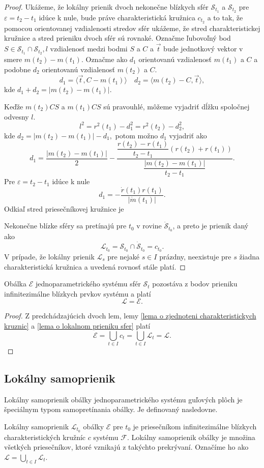 \begin{proof}
Ukážeme, že lokálny prienik dvoch nekonečne blízkych sfér $\mathcal{S}_{t_1}$ a $\mathcal{S}_{t_2}$ pre $\varepsilon = t_2 - t_1$ idúce k nule, bude práve charakteristická kružnica $c_{t_2}$ a to tak, že pomocou orientovanej vzdialenosti stredov sfér ukážeme, že stred charakteristickej kružnice a stred prieniku dvoch sfér sú rovnaké.
Označme ľubovoľný bod $S \in \mathcal{S}_{t_1} \cap \mathcal{S}_{t_2}, l $ vzdialenosť medzi bodmi $S$ a $C$ a $\vec{t} $ bude jednotkový vektor v smere $ m(t_2) - m(t_1).$
Označme ako $d_1$ orientovanú vzdialenosť $m(t_1)$ a $C$ a podobne $d_2$ orientovanú vzdialenosť $m(t_2)$ a $C.$
$$ d_1 = \langle \vec{t}, C - m(t_1) \rangle \quad d_2 = \langle m(t_2) - C,  \vec{t} \rangle, $$
kde $d_1 + d_2 = | m(t_2) - m(t_1) |.$

Keďže $m(t_2)CS$ a $m(t_1)CS$ sú pravouhlé, môžeme vyjadriť dĺžku spoločnej odvesny $l.$
$$l^2 = r^2(t_1) - d^2_1 = r^2(t_2) - d^2_2,$$
kde $d_2 = |m(t_2) - m(t_1)| - d_1, $
potom možno $d_1$ vyjadriť ako 
$$d_1 = \dfrac{ | m(t_2) - m(t_1) |}{2} - \dfrac{\dfrac{r(t_2)-r(t_1)}{t_2-t_1} (r(t_2) +r(t_1))}{\dfrac{ | m(t_2)-m(t_1) |}{t_2 - t_1}}.$$
Pre $\varepsilon = t_2 - t_1 $ idúce k nule
$$ d_1 = - \dfrac{\dot{r}(t_1) r(t_1)}{| \dot{m}(t_1) |}.  $$
Odkiaľ stred priesečníkovej kružnice je

Nekonečne blízke sféry sa pretínajú pre $t_0$ v rovine $\mathcal{\dot{S}}_{t_0}$, a preto je prienik daný ako 
$$ \mathcal{L}_{t_0} = \mathcal{S}_{t_0} \cap \mathcal{\dot{S}}_{t_0} = c_{t_0}. $$
V prípade, že lokálny prienik $\mathcal{L}_{s}$ pre nejaké $s \in I$ prázdny, neexistuje pre $s$ žiadna charakteristická kružnica a uvedená rovnosť stále platí.
\end{proof}

\begin{theorem}
Obálka $\mathcal{E}$ jednoparametrického systému sfér $\mathcal{S}_t$ pozostáva z bodov prieniku infinitezimálne blízkych prvkov systému a platí $$
\mathcal{L} = \mathcal{E}.
$$
\end{theorem}

\begin{proof}
Z predchádzajúcich dvoch lem, lemy \ref{lema o zjednoteni charakteristickych kruznic} a \ref{lema o lokalnom prieniku sfer} platí 
$$ \mathcal{E} = \bigcup_{t \in I } c_t = \bigcup_{t \in I} \mathcal{L}_t = \mathcal{L}. $$
\end{proof}

\subsection{Lokálny samoprienik}
Lokálny samoprienik obálky jednoparametrického systému guľových plôch je špeciálnym typom samopretínania obálky. Je definovaný nasledovne.
\begin{definition} \label{definicia lokalny samoprienik}
Lokálny samoprienik $\mathcal{L}_{t_0}$ obálky $\mathcal{E}$ pre $t_0$ je priesečníkom infinitezimálne blízkych charakteristických kružníc $c$ systému $\mathcal{F}$. Lokálny samoprienik obálky je množina všetkých priesečníkov, ktoré vznikajú z takýchto prekrývaní. Označíme ho ako $\mathcal{L} = \bigcup_{t \in I} \mathcal{L}_t$.
\end{definition}

